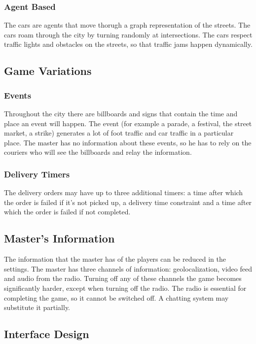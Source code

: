 \documentclass{article}
\begin{document}
\subsubsection{Agent Based}
The cars are agents that move thorugh a graph representation of the streets. The cars roam through the city by turning randomly at intersections. The cars respect traffic lights and obstacles on the streets, so that traffic jams happen dynamically.

\subsection{Game Variations}
\subsubsection{Events}
Throughout the city there are billboards and signs that contain the time and place an event will happen. The event (for example a parade, a festival, the street market, a strike) generates a lot of foot traffic and car traffic in a particular place. The master has no information about these events, so he has to rely on the couriers who will see the billboards and relay the information.
\subsubsection{Delivery Timers}
The delivery orders may have up to three additional timers: a time after which the order is failed if it's not picked up, a delivery time constraint and a time after which the order is failed if not completed.

\subsection{Master's Information}
The information that the master has of the players can be reduced in the settings. The master has three channels of information: geolocalization, video feed and audio from the radio. Turning off any of these channels the game becomes significantly harder, except when turning off the radio. The radio is essential for completing the game, so it cannot be switched off. A chatting system may substitute it partially.

\subsection{Interface Design}

\clearpage
\end{document}
